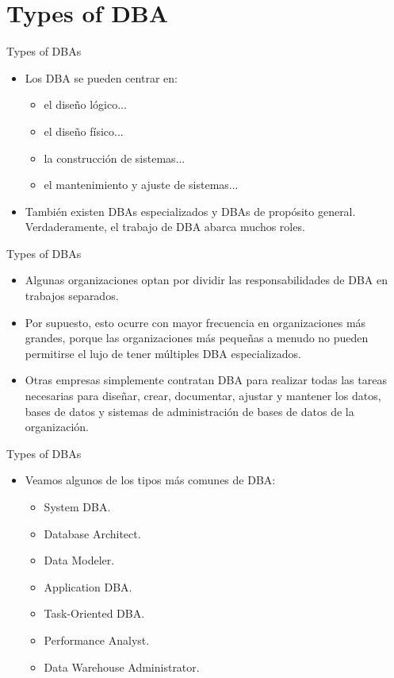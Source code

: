 \documentclass{beamer}
\begin{document}
\section{Types of DBA}

\begin{frame}{Types of DBAs}
    \begin{itemize}
        \item Los DBA se pueden centrar en:
        \begin{itemize}
            \item el diseño lógico...
            \item el diseño físico...
            \item la construcción de sistemas...
            \item el mantenimiento y ajuste de sistemas...
        \end{itemize}
        \item También existen DBAs especializados y DBAs de propósito general. Verdaderamente, el trabajo de DBA abarca muchos roles. 
    \end{itemize}
\end{frame}

\begin{frame}{Types of DBAs}
    \begin{itemize}
        \item Algunas organizaciones optan por dividir las responsabilidades de DBA en trabajos separados. 
        \item Por supuesto, esto ocurre con mayor frecuencia en organizaciones más grandes, porque las organizaciones más pequeñas a menudo no pueden permitirse el lujo de tener múltiples DBA especializados. 
        \item Otras empresas simplemente contratan DBA para realizar todas las tareas necesarias para diseñar, crear, documentar, ajustar y mantener los datos, bases de datos y sistemas de administración de bases de datos de la organización. 
    \end{itemize}
\end{frame}

\begin{frame}{Types of DBAs}
    \begin{itemize}
        \item Veamos algunos de los tipos más comunes de DBA:
        \begin{itemize}
            \item System DBA.
            \item Database Architect.
            \item Data Modeler.
            \item Application DBA.
            \item Task-Oriented DBA.
            \item Performance Analyst.
            \item Data Warehouse Administrator.
        \end{itemize}
    \end{itemize}
\end{frame}
\end{document}
